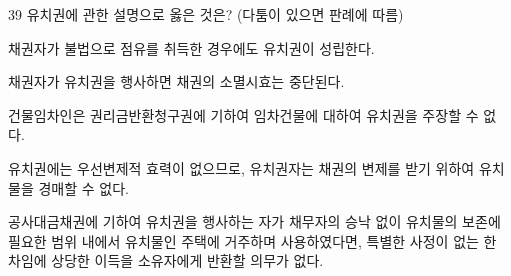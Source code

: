 \begin{question}{39}
유치권에 관한 설명으로 옳은 것은? (다툼이 있으면 판례에 따름)
\begin{choices}
  \item 채권자가 불법으로 점유를 취득한 경우에도 유치권이 성립한다.
  \item 채권자가 유치권을 행사하면 채권의 소멸시효는 중단된다.
  \item 건물임차인은 권리금반환청구권에 기하여 임차건물에 대하여 유치권을 주장할 수 없다.
  \item 유치권에는 우선변제적 효력이 없으므로, 유치권자는 채권의 변제를 받기 위하여 유치물을 경매할 수 없다.
  \item 공사대금채권에 기하여 유치권을 행사하는 자가 채무자의 승낙 없이 유치물의 보존에 필요한 범위 내에서 유치물인 주택에 거주하며 사용하였다면, 특별한 사정이 없는 한 차임에 상당한 이득을 소유자에게 반환할 의무가 없다.
\end{choices}
\end{question}
